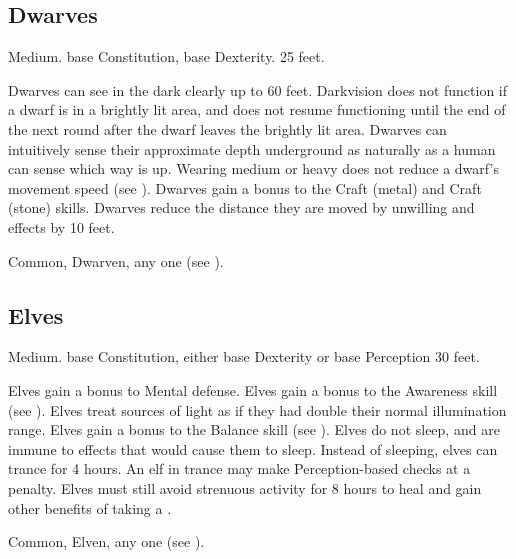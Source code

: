     \subsection{Dwarves}
         Medium.
          base Constitution,  base Dexterity.
         25 feet.
        \begin{raggeditemize}
             Dwarves can see in the dark clearly up to 60 feet. Darkvision does not function if a dwarf is in a brightly lit area, and does not resume functioning until the end of the next round after the dwarf leaves the brightly lit area.
             Dwarves can intuitively sense their approximate depth underground as naturally as a human can sense which way is up.
             Wearing medium or heavy  does not reduce a dwarf's movement speed (see ).
             Dwarves gain a  bonus to the Craft (metal) and Craft (stone) skills.
             Dwarves reduce the distance they are moved by unwilling  and  effects by 10 feet.
        \end{raggeditemize}
         Common, Dwarven, any one  (see ).

    \subsection{Elves}
         Medium.
          base Constitution, either  base Dexterity or  base Perception
         30 feet.
        \begin{raggeditemize}
             Elves gain a  bonus to Mental defense.
             Elves gain a  bonus to the Awareness skill (see ).
             Elves treat sources of light as if they had double their normal illumination range.
             Elves gain a  bonus to the Balance skill (see ).
             Elves do not sleep, and are immune to  effects that would cause them to sleep.
                Instead of sleeping, elves can trance for 4 hours.
                An elf in trance may make Perception-based checks at a  penalty.
                Elves must still avoid strenuous activity for 8 hours to heal and gain other benefits of taking a .
        \end{raggeditemize}
         Common, Elven, any one  (see ).

